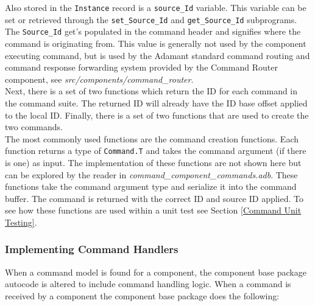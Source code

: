 Also stored in the \texttt{Instance} record is a \texttt{source\_Id} variable. This variable can be set or retrieved through the \texttt{set\_Source\_Id} and \texttt{get\_Source\_Id} subprograms. The \texttt{Source\_Id} get's populated in the command header and signifies where the command is originating from. This value is generally not used by the component executing command, but is used by the Adamant standard command routing and command response forwarding system provided by the Command Router component, see \textit{src/components/command\_router}. \\

Next, there is a set of two functions which return the ID for each command in the command suite. The returned ID will already have the ID base offset applied to the local ID. Finally, there is a set of two functions that are used to create the two commands. \\

The most commonly used functions are the command creation functions. Each function returns a type of \texttt{Command.T} and takes the command argument (if there is one) as input. The implementation of these functions are not shown here but can be explored by the reader in \textit{command\_component\_commands.adb}. These functions take the command argument type and serialize it into the command buffer. The command is returned with the correct ID and source ID applied. To see how these functions are used within a unit test see Section \ref{Command Unit Testing}.

\subsubsection{Implementing Command Handlers}

When a command model is found for a component, the component base package autocode is altered to include command handling logic. When a command is received by a component the component base package does the following:

